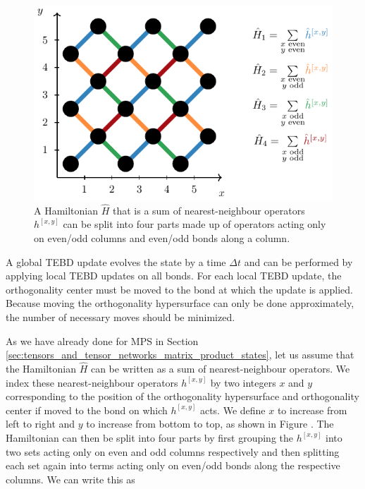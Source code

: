 \begin{figure}
	\centering
	\includegraphics[scale=1]{figures/tikz/disoTPS/tebd_global_update/tebd_global_update_a.pdf}
	\caption{A Hamiltonian $\hat{H}$ that is a sum of nearest-neighbour operators $h^{[x,y]}$ can be split into four parts made up of operators acting only on even/odd columns and even/odd bonds along a column.}
	\label{fig:disoTPS_TEBD_global_update_TEBD1_splitting_and_TEBD2_chain}
\end{figure}
A global TEBD update evolves the state by a time $\Delta t$ and can be performed by applying local TEBD updates on all bonds. For each local TEBD update, the orthogonality center must be moved to the bond at which the update is applied. Because moving the orthogonality hypersurface can only be done approximately, the number of necessary moves should be minimized. \par
As we have already done for MPS in Section \ref{sec:tensors_and_tensor_networks_matrix_product_states}, let us assume that the Hamiltonian $\hat{H}$ can be written as a sum of nearest-neighbour operators. We index these nearest-neighbour operators $h^{[x, y]}$ by two integers $x$ and $y$ corresponding to the position of the orthogonality hypersurface and orthogonality center if moved to the bond on which $h^{[x,y]}$ acts. We define $x$ to increase from left to right and $y$ to increase from bottom to top, as shown in Figure . The Hamiltonian can then be split into four parts by first grouping the $h^{[x,y]}$ into two sets acting only on even and odd columns respectively and then splitting each set again into terms acting only on even/odd bonds along the respective columns. We can write this as
